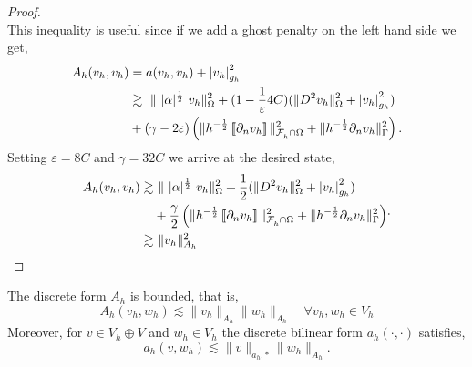 \begin{proof}
\begin{equation}
    \end{equation}
    This inequality is useful since if we add a ghost penalty on the left hand side we get,
    \begin{equation}
        \begin{split}
     A_{h}( v_{h},v_{h}) & = a( v_{h},v_{h}) + \left\lvert  v_{h}  \right\rvert_{g_{h}}^{2} \\
     & \gtrsim    \   \| \ |\alpha|^{\frac{1}{2}} \  v_{h}  \|_{   \Omega   }^{2} + (1  - \frac{1}{\varepsilon } 4C)  (\| D^2 v_{h} \|_{ \Omega  }^{ 2 }  + \left\lvert  v_{h}  \right\rvert _{ g_{h} }^{2  } )  \\
                       & + (\gamma - 2\varepsilon  )\left( \|h^{-\frac{1}{2}}  \left[\!\left[  \partial _{n} v_{h}  \right]\!\right]\|_{\mathcal{F} _{h}^{}\cap \Omega   }^{ 2 } + \| h^{-\frac{1}{2}} \partial _{n} v_{h} \|_{ \Gamma  }^{ 2} \right)        .
        \end{split}
    \end{equation}
    Setting $\varepsilon = 8C$ and $\gamma = 32C $ we arrive at the desired state,
    \begin{equation}
        \begin{split}
           A_{h}( v_{h},v_{h})  \gtrsim & \   \| \ |\alpha|^{\frac{1}{2}} \    v_{h}  \|_{  \Omega   }^{2} + \frac{1}{2}  (\| D^2 v_{h} \|_{ \Omega  }^{ 2 }  + \abs{ v_{h} } _{ g_{h} }^{2  } )  \\
                       & + \frac{\gamma }{2}\left( \|h^{-\frac{1}{2}}  \jump{ \partial _{n} v_{h} }\|_{\mathcal{F} _{h}^{}\cap \Omega   }^{ 2 } + \| h^{-\frac{1}{2}} \partial _{n} v_{h} \|_{ \Gamma  }^{ 2} \right) \\
                        \gtrsim & \  \| v_{h} \|_{ A_{h} }^{2  }
        \end{split}
.
    \end{equation}
\end{proof}


\begin{lemma}
    \label{lemma:bi_Ah_bounded}
    The discrete form $A_{h}$ is bounded, that is,
    \begin{equation}
    \label{eq:bi_A_h_bounded}
     A_{h}( v_{h},w_{h}) \lesssim \| v_{h} \|_{A_{h}  }^{  }\| w_{h} \|_{A_{h}  }^{  } \quad   \forall v_{h},w_{h} \in V_{h}
    \end{equation}
    Moreover, for $v \in V_{h} \oplus V$  and $w_{h} \in V_{h}$ the discrete bilinear form $a_{h}( \cdot ,\cdot  ) $ satisfies,
    \begin{equation}
        \label{eq:bi_a_h_bounded}
        a_{h} ( v,w_{h}) \lesssim \| v \|_{ a_{h},* }^{  } \| w_{h} \|_{ A_{h} }^{  }.
    \end{equation}
\end{lemma}

